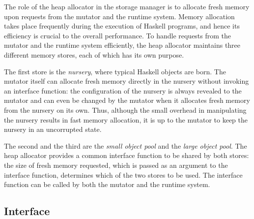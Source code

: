 \documentclass{article}
\begin{document}
The role of the heap allocator in the storage manager is to allocate fresh
memory upon requests from the mutator and the runtime system.
Memory allocation takes place frequently during the execution of Haskell 
programs, and hence its efficiency is crucial to the overall performance.
To handle requests from the mutator and the runtime system efficiently,
the heap allocator maintains three different memory stores,
each of which has its own purpose.

The first store is the \emph{nursery}, where typical Haskell 
objects are born.
The mutator itself can allocate fresh memory directly in the nursery 
without invoking an interface function:
the configuration of the nursery is always revealed to the mutator and can even
be changed by the mutator when it allocates fresh memory from the nursery
on its own.
Thus, although the small overhead in manipulating the nursery results in fast
memory allocation, it is up to the mutator to keep the nursery in an 
uncorrupted state.

The second and the third are the \emph{small object pool} and the
\emph{large object pool}.
The heap allocator provides a common interface function to be shared by both stores:
the size of fresh memory requested, which is passed as an argument to the 
interface function, determines which of the two stores to be used.
The interface function can be called by both the mutator and the runtime system.

\subsection{Interface}
\end{document}
